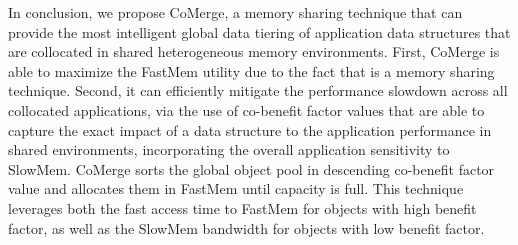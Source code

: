 \noindent In conclusion, we propose CoMerge, a memory sharing technique that can provide the most intelligent global data tiering of application data structures that are collocated in shared heterogeneous memory environments. First, CoMerge is able to maximize the FastMem utility due to the fact that is a memory sharing technique. Second, it can efficiently mitigate the performance slowdown across all collocated applications, via the use of co-benefit factor values that are able to capture the exact impact of a data structure to the application performance in shared environments, incorporating the overall application sensitivity to SlowMem. CoMerge sorts the global object pool in descending co-benefit factor value and allocates them in FastMem until capacity is full. This technique leverages both the fast access time to FastMem for objects with high benefit factor, as well as the  SlowMem bandwidth for objects with low benefit factor. 

